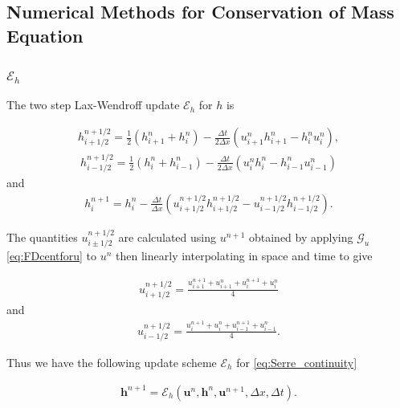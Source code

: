 \documentclass[times]{elsarticle}
\begin{document}
\subsection{Numerical Methods for Conservation of Mass Equation}
\subsubsection{$\mathcal{E}_h$}
\label{section:}
The two step Lax-Wendroff update $\mathcal{E}_h$ for $h$ is
\begin{linenomath*}
	\begin{gather*}
	h^{n + 1/2}_{i+ 1/2} = \frac{1}{2}\left(h^{n}_{i+1} + h^{n}_i\right) - \frac{\Delta t}{2\Delta x}\left(u^n_{i+1}h^n_{i+1} - h^n_{i}u^n_{i}\right),
	\end{gather*}
	\begin{gather*}
	h^{n + 1/2}_{i- 1/2} = \frac{1}{2}\left(h^{n}_{i} + h^{n}_{i-1}\right) - \frac{\Delta t}{2\Delta x}\left(u^n_{i}h^n_{i} - h^n_{i-1}u^n_{i-1}\right)
	\end{gather*}
	and
	\begin{gather*}
	h^{n+1}_i = h^{n}_i - \frac{\Delta t}{\Delta x}\left(u^{n + 1/2}_{i+ 1/2}h^{n + 1/2}_{i+ 1/2} - u^{n + 1/2}_{i- 1/2}h^{n + 1/2}_{i- 1/2}\right).
	\label{eq:LW4h}
	\end{gather*}
\end{linenomath*}
The quantities $u^{n + 1/2}_{i \pm 1/2}$ are calculated using $u^{n+1}$ obtained by applying $\mathcal{G}_u$ \eqref{eq:FDcentforu} to $u^n$ then linearly interpolating in space and time to give
\begin{linenomath*}
	\begin{gather*}
	u^{n + 1/2}_{i+ 1/2} = \frac{u^{n+1}_{i+1} + u^{n}_{i+1} + u^{n+1}_{i} + u^{n}_{i} }{4}
	\end{gather*}
	and
	\begin{gather*}
	u^{n + 1/2}_{i- 1/2} = \frac{u^{n+1}_{i} + u^{n}_{i} + u^{n+1}_{i-1}+ u^{n}_{i-1} }{4}.
	\end{gather*}
\end{linenomath*}
Thus we have the following update scheme $\mathcal{E}_h$ for \eqref{eq:Serre_continuity}
\begin{linenomath*}
	\begin{gather}
	\boldsymbol{h}^{n+1} = \mathcal{E}_h\left(\boldsymbol{u}^n,\boldsymbol{h}^n,\boldsymbol{u}^{n+1}, \Delta x, \Delta t \right). 
	\label{eq:LWupdateh}
	\end{gather}
\end{linenomath*}
\end{document}
